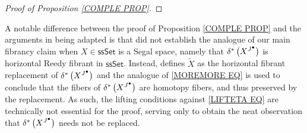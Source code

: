 \documentclass[a4paper,10pt
 ,draft
]{article}%
\begin{document}
\begin{proof}[Proof of Proposition \ref{COMPLE PROP}]
%
%
%
%
%
\end{proof}


\begin{remark}
      \label{COMPLE REM}
A notable difference between the proof of Proposition \ref{COMPLE PROP}
and the arguments in \cite[\S 14]{Rez01} being adapted is that 
\cite{Rez01} did not establish the analogue of our main fibrancy claim
 when $X \in \mathsf{ssSet}$ is a Segal space, namely that $\delta^{\**} \left(X^{J^{\bullet}} \right)$ is horizontal Reedy fibrant in $\mathsf{ssSet}$.
Instead, \cite{Rez01} defines $\tilde{X}$ as the horizontal fibrant replacement of $\delta^{\**} \left(X^{J^{\bullet}} \right)$
and the analogue of \eqref{MOREMORE EQ} is used to conclude that the fibers of 
$\delta^{\**} \left(X^{J^{\bullet}} \right)$ 
are homotopy fibers, and thus preserved by the replacement. 
As such, the lifting conditions against 
\eqref{LIFTETA EQ} are technically not essential for the proof, serving only to obtain the neat observation that 
$\delta^{\**} \left(X^{J^{\bullet}} \right)$ 
needs not be replaced.
\end{remark}
\end{document}
